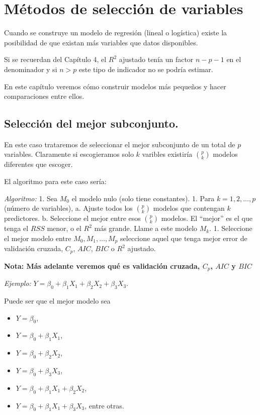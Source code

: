 \documentclass[
  12pt,
]{book}
\theoremstyle{definition}
\theoremstyle{definition}
\theoremstyle{definition}
\theoremstyle{remark}
\begin{document}
\hypertarget{muxe9todos-de-selecciuxf3n-de-variables}{%
\chapter{Métodos de selección de variables}\label{muxe9todos-de-selecciuxf3n-de-variables}}

Cuando se construye un modelo de regresión (lineal o logística) existe la posibilidad de que existan más variables que datos disponibles.

Si se recuerdan del Capítulo 4, el \(R^{2}\) ajustado tenía un factor \(n-p-1\) en el denominador y si \(n>p\) este tipo de indicador no se podría estimar.

En este capítulo veremos cómo construir modelos más pequeños y hacer comparaciones entre ellos.

\hypertarget{selecciuxf3n-del-mejor-subconjunto.}{%
\section{Selección del mejor subconjunto.}\label{selecciuxf3n-del-mejor-subconjunto.}}

En este caso trataremos de seleccionar el mejor subconjunto de un total de \(p\) variables. Claramente si escogieramos solo \(k\) varibles existiría \(\binom{p}{k}\) modelos diferentes que escoger.

El algoritmo para este caso sería:

\emph{Algoritmo:}
1. Sea \(M_0\) el modelo nulo (solo tiene constantes).
1. Para \(k=1,2,\dots,p\) (número de variables),
a. Ajuste todos los \(\binom{p}{k}\) modelos que contengan \(k\) predictores.
b. Seleccione el mejor entre esos \(\binom{p}{k}\) modelos. El \enquote{mejor} es el que tenga el \(RSS\) menor, o el \(R^2\) más grande. Llame a este modelo \(M_k\).
1. Seleccione el mejor modelo entre \(M_0,M_1,\dots,M_p\) seleccione aquel que tenga mejor error de validación cruzada, \(C_p\), \(AIC\), \(BIC\) o \(R^2\) ajustado.

\textbf{Nota: Más adelante veremos qué es validación cruzada, \(C_p\), \(AIC\) y \(BIC\)}

\emph{Ejemplo:} \(Y = \beta_0+\beta_1X_1+ \beta_2X_2 + \beta_3X_3\).

Puede ser que el mejor modelo sea

\begin{itemize}
\item
  \(Y = \beta_0\),
\item
  \(Y = \beta_0+\beta_1X_1\),
\item
  \(Y = \beta_0+\beta_2X_2\),
\item
  \(Y = \beta_0+\beta_3X_3\),
\item
  \(Y = \beta_0+\beta_1X_1+\beta_2X_2\),
\item
  \(Y = \beta_0+\beta_1X_1+\beta_3X_3\), entre otras.
\end{itemize}
\end{document}
